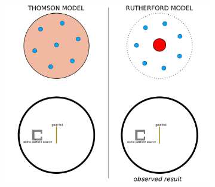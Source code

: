 \documentclass[12pt]{report}
\begin{document}
\begin{figure}[ht]
\begin{subfigure}{.5\textwidth}
		{\includegraphics[width=\linewidth]{assets/atom-model-comparison.png}}
	\end{subfigure}
\end{figure}
\end{document}

